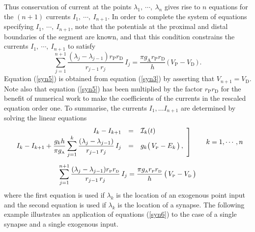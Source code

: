 Thus conservation of current at the points $\lambda_1,\ \cdots,\
\lambda_n$ gives rise to $n$ equations for the $(n+1)$ currents
$I_1,\ \cdots,\ I_{n+1}$. In order to complete the system of
equations specifying $I_1,\ \cdots,\ I_{n+1}$, note that the
potentials at the proximal and distal boundaries of the segment
are known, and that this condition constrains the currents $I_1,\
\cdots,\ I_{n+1}$ to satisfy
\begin{equation}\label{syn5}
\sum_{j=1}^{n+1}
\frac{(\lambda_j-\lambda_{j-1}) r_\mathrm{P}r_\mathrm{D} }
{r_{j-1}\,r_j}\,I_j =
\frac{\pi g_\mathrm{A}r_\mathrm{P}r_\mathrm{D}}{h}\,
\big(\,V_\mathrm{P}-V_\mathrm{D}\,\big)\,.
\end{equation}
Equation (\ref{syn5}) is obtained from equation (\ref{syn3}) by
asserting that $V_{n+1}=V_\mathrm{D}$. Note also that equation
(\ref{syn5}) has been multiplied by the factor $r_\mathrm{P}
r_\mathrm{D}$ for the benefit of numerical work to make the
coefficients of the currents in the rescaled equation order one.
To summarise, the currents $I_1, \dots I_{n+1}$ are determined by
solving the linear equations
\begin{equation}\label{syn6}
\begin{array}{c}
\left.\begin{array}{rcl}
I_k-I_{k+1} & = &\mathcal{I}_k(t) \,\\
\displaystyle I_k-I_{k+1}+\displaystyle\frac{g_k h}{\pi g_{\mbox{\tiny A}}}\sum_{j=1}^k
\frac{(\lambda_j-\lambda_{j-1})}{r_{j-1}\,r_j}\,I_j & = &
g_k\big(\,V_{\mbox{\tiny P}}-E_k\,\big)\,,
\end{array}\right] \qquad k=1,\cdots,n\\[25pt]
\displaystyle\sum_{j=1}^{n+1}
\frac{(\lambda_j-\lambda_{j-1})r_{\mbox{\tiny P}}r_{\mbox{\tiny D}}}
{r_{j-1}\,r_j}\,I_j  =
\displaystyle\frac{\pi g_{\mbox{\tiny A}}r_{\mbox{\tiny P}}r_{\mbox{\tiny D}}}{h}\,
\big(\,V_{\mbox{\tiny P}}-V_{\mbox{\tiny D}}\,\big)
\end{array}
\end{equation}
where the first equation is used if $\lambda_k$ is the location of
an exogenous point input and the second equation is used if
$\lambda_k$ is the location of a synapse. The following example
illustrates an application of equations (\ref{syn6}) to the case
of a single synapse and a single exogenous input.

